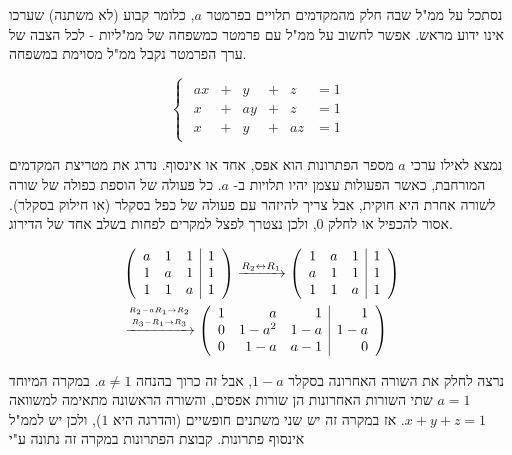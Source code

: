 \documentclass[
  hebrew,
  12pt,
  a4paper,
  oneside]{book}
\theoremstyle{definition}
\theoremstyle{remark}
\theoremstyle{plain}
\theoremstyle{remark}
\begin{document}
\begin{example}

\label{ex:1-parameter} נסתכל על ממ"ל שבה חלק מהמקדמים תלויים בפרמטר
\(a\), כלומר קבוע (לא משתנה) שערכו אינו ידוע מראש. אפשר לחשוב על ממ"ל עם
פרמטר כמשפחה של ממ"ליות - לכל הצבה של ערך הפרמטר נקבל ממ"ל מסוימת
במשפחה.

\[\begin{cases}
\begin{alignedat}{7}
a x &{}+{}&  y &{}+{}&  z &= 1 \\[4pt]
x &{}+{}&  a y &{}+{}&  z &= 1 \\[4pt]
x &{}+{}&  y &{}+{}&  a z &= 1
\end{alignedat}
\end{cases}\]

נמצא לאילו ערכי \(a\) מספר הפתרונות הוא אפס, אחד או אינסוף. נדרג את
מטריצת המקדמים המורחבת, כאשר הפעולות עצמן יהיו תלויות ב- \(a\). כל פעולה
של הוספת כפולה של שורה לשורה אחרת היא חוקית, אבל צריך להיזהר עם פעולה של
כפל בסקלר (או חילוק בסקלר). אסור להכפיל או לחלק \(0\), ולכן נצטרך לפצל
למקרים לפחות בשלב אחד של הדירוג.

\[\begin{aligned}
&\left(\begin{array}{rrr|r}
a & 1 & 1 & 1 \\
1 & a & 1 & 1 \\
1 & 1 & a & 1
\end{array}\right)
\xrightarrow{R_2\leftrightarrow R_1}
\left(\begin{array}{rrr|r}
1 & a & 1 & 1 \\
a & 1 & 1 & 1 \\
1 & 1 & a & 1
\end{array}\right) \\
&\xrightarrow{\overset{R_2 - aR_1 \to R_2}{\underset{R_3 - R_1 \to R_3}{\hphantom{\quad\quad}}}}
\left(\begin{array}{rrr|r}
1 & a & 1 & 1 \\
0 & 1-a^2 & 1-a & 1-a\\
0 & 1-a & a-1 & 0
\end{array}\right)
\end{aligned}\]

נרצה לחלק את השורה האחרונה בסקלר \(1-a\), אבל זה כרוך בהנחה \(a\neq 1\).
במקרה המיוחד \(a=1\) שתי השורות האחרונות הן שורות אפסים, והשורה הראשונה
מתאימה למשוואה \(x+y+z=1\). אז במקרה זה יש שני משתנים חופשיים (והדרגה
היא \(1\)), ולכן יש לממ"ל אינסוף פתרונות. קבוצת הפתרונות במקרה זה נתונה
ע"י


\end{example}
\end{document}
